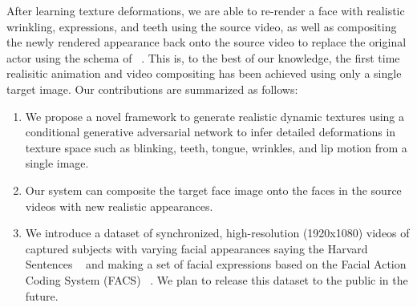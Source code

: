 After learning texture deformations, we are able to re-render a face with realistic wrinkling, expressions, and teeth using the source video, 
as well as compositing the newly rendered appearance back onto the source video to replace the original actor using the schema of ~\cite{replace}.  This is, to the best of our knowledge, the first time realisitic animation and video compositing has been achieved using only a single target image. 
Our contributions are summarized as follows:


\begin{enumerate}
\item We propose a novel framework to generate realistic dynamic textures using a conditional generative adversarial network to infer detailed deformations in texture space such as blinking, teeth, tongue, wrinkles, and lip motion from a single image.
\item Our system can composite the target face image onto the faces in the source videos with new realistic appearances.
\item We introduce a dataset of synchronized, high-resolution (1920x1080) videos of captured subjects with varying facial appearances saying the Harvard Sentences ~\cite{HarvardSent:1969} and making a set of facial expressions based on the Facial Action Coding System (FACS) ~\cite{Ekman:1978}. We plan to release this dataset to the public in the future.
\end{enumerate}
